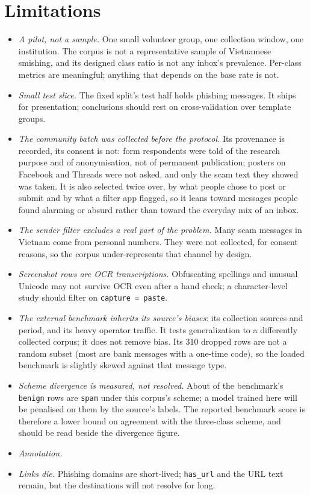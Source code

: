\section*{Limitations}
\begin{itemize}[leftmargin=1.3em,itemsep=1pt,topsep=2pt]
  \item \emph{A pilot, not a sample.} One small volunteer group, one collection window, one
  institution. The corpus is not a representative sample of Vietnamese smishing, and its designed
  class ratio is not any inbox's prevalence. Per-class metrics are meaningful; anything that
  depends on the base rate is not.
  \item \emph{Small test slice.} The fixed split's test half holds \FILL{} phishing messages.
  It ships for presentation; conclusions should rest on cross-validation over template groups.
  \item \emph{The community batch was collected before the protocol.} Its provenance is recorded,
  its consent is not: form respondents were told of the research purpose and of anonymisation, not of permanent
  publication; posters on Facebook and
  Threads were not asked, and only the scam text they showed was taken. It is also selected twice
  over, by what people chose to post or submit and by what a filter app flagged, so it leans
  toward messages people found alarming or absurd rather than toward the everyday mix of an inbox.
  \item \emph{The sender filter excludes a real part of the problem.} Many scam messages in
  Vietnam come from personal numbers. They were not collected, for consent reasons, so the
  corpus under-represents that channel by design.
  \item \emph{Screenshot rows are OCR transcriptions.} Obfuscating spellings and unusual Unicode
  may not survive OCR even after a hand check; a character-level study should filter on
  \texttt{capture = paste}.
  \item \emph{The external benchmark inherits its source's biases}: its collection sources and
  period, and its heavy operator traffic. It tests generalization to a differently collected
  corpus; it does not remove bias. Its 310 dropped rows are not a random subset (most are bank
  messages with a one-time code), so the loaded benchmark is slightly skewed against that
  message type.
  \item \emph{Scheme divergence is measured, not resolved.} About \FILL{} of the benchmark's
  \texttt{benign} rows are \texttt{spam} under this corpus's scheme; a model trained here will be
  penalised on them by the source's labels. The reported benchmark score is therefore a lower
  bound on agreement with the three-class scheme, and should be read beside the divergence
  figure.
  \item \emph{Annotation.} 
  \item \emph{Links die.} Phishing domains are short-lived; \texttt{has\_url} and the URL text
  remain, but the destinations will not resolve for long.
\end{itemize}
